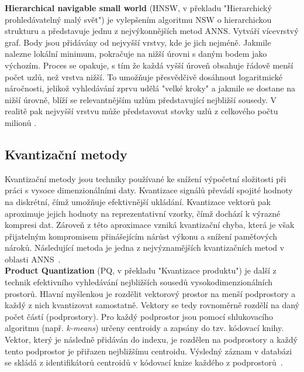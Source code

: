 \textbf{Hierarchical navigable small world} (HNSW, v překladu "Hierarchický prohledávatelný malý svět") je vylepšením algoritmu NSW o hierarchickou strukturu a představuje jednu z nejvýkonnějších metod ANNS. Vytváří vícevrstvý graf. Body jsou přidávány od nejvyšší vrstvy, kde je jich nejméně. Jakmile nalezne lokální minimum, pokračuje na nižší úrovni s daným bodem jako výchozím. Proces se opakuje, s tím že každá vyšší úroveň obsahuje řádově menší počet uzlů, než vrstva nižší. To umožňuje přesvědčivě dosáhnout logaritmické náročnosti, jelikož vyhledávání zprvu udělá "velké kroky" a jakmile se dostane na nižší úrovně, blíží se relevantnějším uzlům představující nejbližší sousedy. V realitě pak nejvyšší vrstvu může představovat stovky uzlů z celkového počtu milionů \cite{hnsw}. \\


\subsection{Kvantizační metody}
Kvantizační metody jsou techniky používané ke snížení výpočetní složitosti při práci s vysoce dimenzionálními daty. Kvantizace signálů převádí spojité hodnoty na diskrétní, čímž umožňuje efektivnější ukládání. Kvantizace vektorů pak aproximuje jejich hodnoty na reprezentativní vzorky, čímž dochází k výrazné kompresi dat. Zároveň z této aproximace vzniká kvantizační chyba, která je však přijatelným kompromisem přinášejícím nárůst výkonu a snížení paměťových nároků. Následující metoda je jedna z nejvýznamějších kvantizačních metod v oblasti ANNS~\cite{pq}. \\

\textbf{Product Quantization} (PQ, v překladu "Kvantizace produktu") je další z technik efektivního vyhledávání nejbližších sousedů vysokodimenzionálních prostorů. Hlavní myšlenkou je rozdělit vektorový prostor na menší podprostory a každý z nich kvantizovat samostatně. Vektory se tedy rovnoměrně rozdělí na daný počet částí (podprostory). Pro každý podprostor jsou pomocí shlukovacího algoritmu (např. \textit{k-means}) určeny centroidy a zapsány do tzv. kódovací knihy. Vektor, který je následně přidáván do indexu, je rozdělen na podprostory a každý tento podprostor je přiřazen nejbližšímu centroidu. Výsledný záznam v databázi se skládá z identifikátorů centroidů v kódovací knize každého z podprostorů~\cite{pq}.

